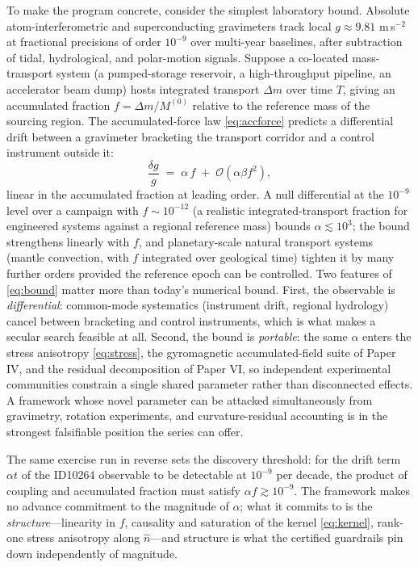 \documentclass[11pt]{article}
\theoremstyle{remark}
\begin{document}
To make the program concrete, consider the simplest laboratory bound. Absolute atom-interferometric and superconducting gravimeters track local $g \approx 9.81$ m\,s$^{-2}$ at fractional precisions of order $10^{-9}$ over multi-year baselines, after subtraction of tidal, hydrological, and polar-motion signals. Suppose a co-located mass-transport system (a pumped-storage reservoir, a high-throughput pipeline, an accelerator beam dump) hosts integrated transport $\Delta m$ over time $T$, giving an accumulated fraction $f = \Delta m / M^{(0)}$ relative to the reference mass of the sourcing region. The accumulated-force law \eqref{eq:accforce} predicts a differential drift between a gravimeter bracketing the transport corridor and a control instrument outside it:
\begin{equation}
\frac{\delta g}{g} \;=\; \alpha\, f \;+\; \mathcal{O}(\alpha \beta f^2),
\label{eq:bound}
\end{equation}
linear in the accumulated fraction at leading order. A null differential at the $10^{-9}$ level over a campaign with $f \sim 10^{-12}$ (a realistic integrated-transport fraction for engineered systems against a regional reference mass) bounds $\alpha \lesssim 10^{3}$; the bound strengthens linearly with $f$, and planetary-scale natural transport systems (mantle convection, with $f$ integrated over geological time) tighten it by many further orders provided the reference epoch can be controlled. Two features of \eqref{eq:bound} matter more than today's numerical bound. First, the observable is \emph{differential}: common-mode systematics (instrument drift, regional hydrology) cancel between bracketing and control instruments, which is what makes a secular search feasible at all. Second, the bound is \emph{portable}: the same $\alpha$ enters the stress anisotropy \eqref{eq:stress}, the gyromagnetic accumulated-field suite of Paper IV, and the residual decomposition of Paper VI, so independent experimental communities constrain a single shared parameter rather than disconnected effects. A framework whose novel parameter can be attacked simultaneously from gravimetry, rotation experiments, and curvature-residual accounting is in the strongest falsifiable position the series can offer.

The same exercise run in reverse sets the discovery threshold: for the drift term $\alpha t$ of the ID10264 observable to be detectable at $10^{-9}$ per decade, the product of coupling and accumulated fraction must satisfy $\alpha f \gtrsim 10^{-9}$. The framework makes no advance commitment to the magnitude of $\alpha$; what it commits to is the \emph{structure}---linearity in $f$, causality and saturation of the kernel \eqref{eq:kernel}, rank-one stress anisotropy along $\hat{n}$---and structure is what the certified guardrails pin down independently of magnitude.
\end{document}
